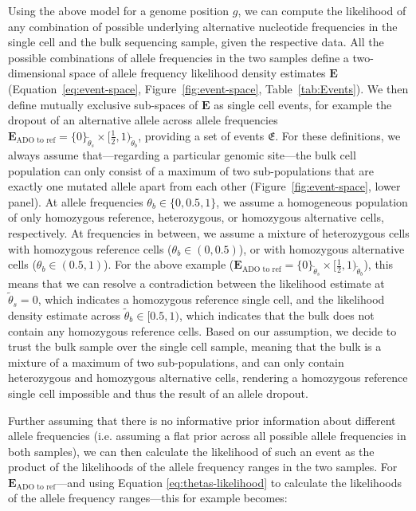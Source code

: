\documentclass[authoryear,preprint,11pt]{scrartcl}
\begin{document}
Using the above model for a genome position $g$, we can compute the likelihood of any combination of possible underlying alternative nucleotide frequencies in the single cell and the bulk sequencing sample, given the respective data.
All the possible combinations of allele frequencies in the two samples define a two-dimensional space of allele frequency likelihood density estimates $\boldsymbol{E}$ (Equation~\ref{eq:event-space}, Figure~\ref{fig:event-space}, Table~\ref{tab:Events}).
We then define mutually exclusive sub-spaces of $\boldsymbol{E}$ as single cell events, for example the dropout of an alternative allele across allele frequencies $\boldsymbol{E}_{\text{ADO to ref}} = \{ 0 \}_{\tilde{\theta}_s} \times [\frac{1}{2}, 1)_{\tilde{\theta}_b}$, providing a set of events $\mathfrak{E}$.
For these definitions, we always assume that---regarding a particular genomic site---the bulk cell population can only consist of a maximum of two sub-populations that are exactly one mutated allele apart from each other (Figure~\ref{fig:event-space}, lower panel).
At allele frequencies $\theta_b \in \{0, 0.5, 1\}$, we assume a homogeneous population of only homozygous reference, heterozygous, or homozygous alternative cells, respectively.
At frequencies in between, we assume a mixture of heterozygous cells with homozygous reference cells ($\theta_b \in (0,0.5)$), or with homozygous alternative cells ($\theta_b \in (0.5,1)$).
For the above example ($\boldsymbol{E}_{\text{ADO to ref}} = \{ 0 \}_{\tilde{\theta}_s} \times [\frac{1}{2}, 1)_{\tilde{\theta}_b}$), this means that we can resolve a contradiction between the likelihood estimate at $\tilde{\theta}_s = 0$, which indicates a homozygous reference single cell, and the likelihood density estimate across $\tilde{\theta}_b \in [0.5,1)$, which indicates that the bulk does not contain any homozygous reference cells.
Based on our assumption, we decide to trust the bulk sample over the single cell sample, meaning that the bulk is a mixture of a maximum of two sub-populations, and can only contain heterozygous and homozygous alternative cells, rendering a homozygous reference single cell impossible and thus the result of an allele dropout.

Further assuming that there is no informative prior information about different allele frequencies (i.e. assuming a flat prior across all possible allele frequencies in both samples), we can then calculate the likelihood of such an event as the product of the likelihoods of the allele frequency ranges in the two samples.
For $\boldsymbol{E}_{\text{ADO to ref}}$---and using Equation \ref{eq:thetas-likelihood} to calculate the likelihoods of the allele frequency ranges---this for example becomes:
\end{document}
